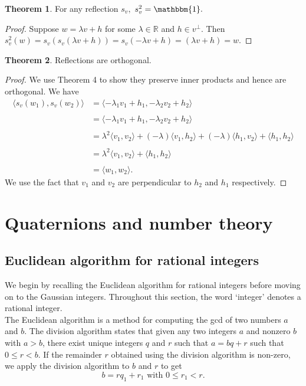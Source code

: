 \documentclass[11pt]{report}
\theoremstyle{plain}
\theoremstyle{definition}
\newtheorem{theorem}{Theorem}
\newcommand\inner[2]{\langle #1, #2 \rangle}
\begin{document}
	\begin{theorem}
 For any reflection $ s_v ,$ $ s_v ^2 = \mathbbm{1}. $
	\end{theorem}
	\begin{proof}
		Suppose $ w = \lambda v + h $ for some $ \lambda \in \mathbb{R} $ and $ h \in v^\bot $. Then $ s_v ^2 (w) = s_v(s_v(\lambda v + h )) = s_v(-\lambda v + h) = (\lambda v + h) = w. $
	\end{proof}
	\begin{theorem}
		Reflections are orthogonal.
	\end{theorem}
	\begin{proof}
		We use Theorem 4 to show they preserve inner products and hence are orthogonal.
		We have 
	\begin{align*}
		 \inner{s_v(w_1)}{s_v(w_2)} &= \inner{-\lambda_1 v_1+h_1}{-\lambda_2 v_2+h_2}\\ \\ 
		&= \inner{-\lambda_1 v_1+h_1}{-\lambda_2 v_2+h_2}\\ \\ 
		&= \lambda^2 \inner{v_1}{v_2} + (-\lambda) \inner{v_1}{h_2} + (-\lambda) \inner{h_1}{v_2} +\inner{h_1}{h_2}\\ \\
		&= \lambda^2 \inner{v_1}{v_2} + \inner{h_1}{h_2}\\ \\ 
		&= \inner{w_1}{w_2}.  
	\end{align*}
		We use the fact that $ v_1 $ and $ v_2 $ are perpendicular to $ h_2 $ and $ h_1 $ respectively.
	\end{proof}
	

\chapter{Quaternions and number theory}
\section{Euclidean algorithm for rational integers}
We begin by recalling the Euclidean algorithm for rational integers before moving on to the Gaussian integers. Throughout this section, the word `integer' denotes a rational integer. \\ 
The Euclidean algorithm is a method for computing the gcd of two numbers $ a $ and $ b $. The division algorithm states that given any two integers $ a $ and nonzero $ b $ with $ a > b $, there exist unique integers $ q $ and $ r $ such that $  a=bq+r $ such that $ 0 \leq r < b.  $
If the remainder $ r $ obtained using the division algorithm is non-zero, we apply the division algorithm to $ b $ and $ r $ to get
$$ b=rq_1 + r_1 \text{ with } 0 \leq r_1 < r. $$
\end{document}

